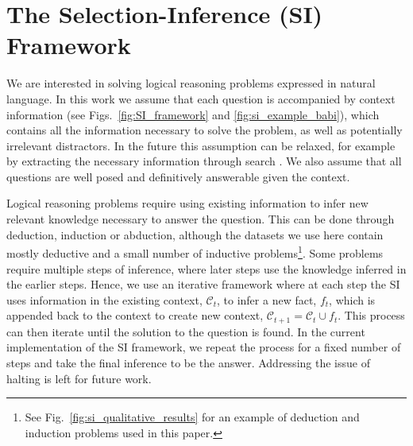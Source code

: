 \section{The Selection-Inference (SI) Framework} \label{sec:selection_inference}

We are interested in solving logical reasoning problems expressed in natural language. In this work we assume that each question is accompanied by context information (see Figs.~\ref{fig:SI_framework} and \ref{fig:si_example_babi}), which contains all the information necessary to solve the problem, as well as potentially irrelevant distractors. In the future this assumption can be relaxed, for example by extracting the necessary information through search \citep{lazaridou2022internet, menick2022teaching}. We also assume that all questions are well posed and definitively answerable given the context. 

Logical reasoning problems require using existing information to infer new relevant knowledge necessary to answer the question. This can be done through deduction, induction or abduction, although the datasets we use here contain mostly deductive and a small number of inductive problems\footnote{See Fig.~\ref{fig:si_qualitative_results} for an example of deduction and induction problems used in this paper.}. Some problems require multiple steps of inference, where later steps use the knowledge inferred in the earlier steps. Hence, we use an iterative framework where at each step the SI uses information in the existing context, $\mathcal{C}_t$, to infer a new fact, $f_t$, which is appended back to the context to create new context, $\mathcal{C}_{t+1} = \mathcal{C}_t \cup f_t$. This process can then iterate until the solution to the question is found. In the current implementation of the SI framework, we repeat the process for a fixed number of steps and take the final inference to be the answer. Addressing the issue of halting is left for future work.

